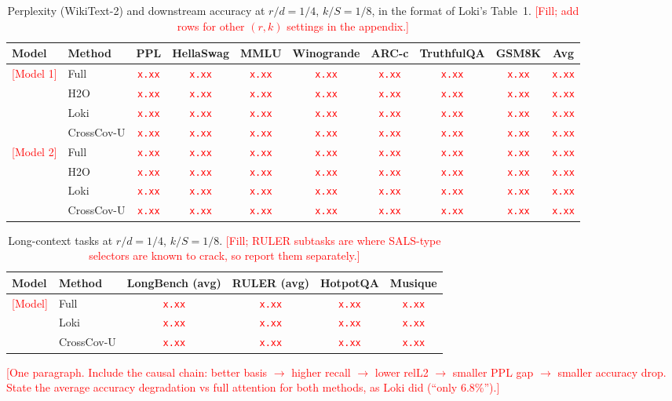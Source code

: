 \documentclass[10pt]{article}
\newcommand{\TODO}[1]{\textcolor{red}{[#1]}}
\newcommand{\NUM}{\textcolor{red}{\texttt{x.xx}}}
\newcommand{\method}{CrossCov-U}
\theoremstyle{plain}
\theoremstyle{definition}
\theoremstyle{remark}
\begin{document}
\begin{table}[t]
\centering
\caption{Perplexity (WikiText-2) and downstream accuracy at $r/d=1/4$, $k/S=1/8$, in the format of Loki's Table~1. \TODO{Fill; add rows for other $(r,k)$ settings in the appendix.}}
\label{tab:main}
\small
\begin{tabular}{llcccccccc}
\toprule
Model & Method & PPL & HellaSwag & MMLU & Winogrande & ARC-c & TruthfulQA & GSM8K & Avg \\
\midrule
\multirow{4}{*}{\TODO{Model 1}}
 & Full      & \NUM & \NUM & \NUM & \NUM & \NUM & \NUM & \NUM & \NUM \\
 & H2O       & \NUM & \NUM & \NUM & \NUM & \NUM & \NUM & \NUM & \NUM \\
 & Loki      & \NUM & \NUM & \NUM & \NUM & \NUM & \NUM & \NUM & \NUM \\
 & \method{} & \NUM & \NUM & \NUM & \NUM & \NUM & \NUM & \NUM & \NUM \\
\midrule
\multirow{4}{*}{\TODO{Model 2}}
 & Full      & \NUM & \NUM & \NUM & \NUM & \NUM & \NUM & \NUM & \NUM \\
 & H2O       & \NUM & \NUM & \NUM & \NUM & \NUM & \NUM & \NUM & \NUM \\
 & Loki      & \NUM & \NUM & \NUM & \NUM & \NUM & \NUM & \NUM & \NUM \\
 & \method{} & \NUM & \NUM & \NUM & \NUM & \NUM & \NUM & \NUM & \NUM \\
\bottomrule
\end{tabular}
\end{table}

\begin{table}[t]
\centering
\caption{Long-context tasks at $r/d=1/4$, $k/S=1/8$. \TODO{Fill; RULER subtasks are where SALS-type selectors are known to crack, so report them separately.}}
\label{tab:long}
\begin{tabular}{llcccc}
\toprule
Model & Method & LongBench (avg) & RULER (avg) & HotpotQA & Musique \\
\midrule
\multirow{3}{*}{\TODO{Model}}
 & Full      & \NUM & \NUM & \NUM & \NUM \\
 & Loki      & \NUM & \NUM & \NUM & \NUM \\
 & \method{} & \NUM & \NUM & \NUM & \NUM \\
\bottomrule
\end{tabular}
\end{table}

\TODO{One paragraph. Include the causal chain: better basis $\to$ higher recall
$\to$ lower relL2 $\to$ smaller PPL gap $\to$ smaller accuracy drop. State the
average accuracy degradation vs full attention for both methods, as Loki did
(``only 6.8\%'').}
\end{document}
